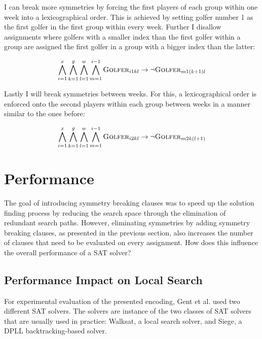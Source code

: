 \documentclass[a4paper]{scrartcl}
\begin{document}
I can break more symmetries by forcing the first players of each group within one week into a lexicographical order. This is achieved by setting golfer number 1 as the first golfer in the first group within every week. Further I disallow assignments where golfers with a smaller index than the first golfer within a group are assigned the first golfer in a group with a bigger index than the latter:

\begin{equation}
\centering
    \bigwedge \limits_{i=1}^x
    \bigwedge \limits_{k=1}^g
    \bigwedge \limits_{l=1}^w
    \bigwedge \limits_{m=1}^{i-1}
    \textsc{Golfer}_{i1kl}
    \to
    \neg \textsc{Golfer}_{m1(k+1)l}
\end{equation}

Lastly I will break symmetries between weeks. For this, a lexicographical order is enforced onto the second players within each group between weeks in a manner similar to the ones before:

\begin{equation}
\centering
    \bigwedge \limits_{i=1}^x
    \bigwedge \limits_{k=1}^g
    \bigwedge \limits_{l=1}^w
    \bigwedge \limits_{m=1}^{i-1}
    \textsc{Golfer}_{i2kl}
    \to
    \neg \textsc{Golfer}_{m2k(l+1)}
\end{equation}


\section{Performance}

The goal of introducing symmetry breaking clauses was to speed up the solution finding process by reducing the search space through the elimination of redundant search paths. However, eliminating symmetries by adding symmetry breaking clauses, as presented in the previous section, also increases the number of clauses that need to be evaluated on every assignment. How does this influence the overall performance of a SAT solver?


\subsection{Performance Impact on Local Search}

For experimental evaluation of the presented encoding, Gent et al. used two different SAT solvers. The solvers are instance of the two classes of SAT solvers that are usually used in practice: Walksat\cite{walksat2004}, a local search solver, and Siege\cite{Ryan04}, a DPLL backtracking-based solver.
\end{document}
